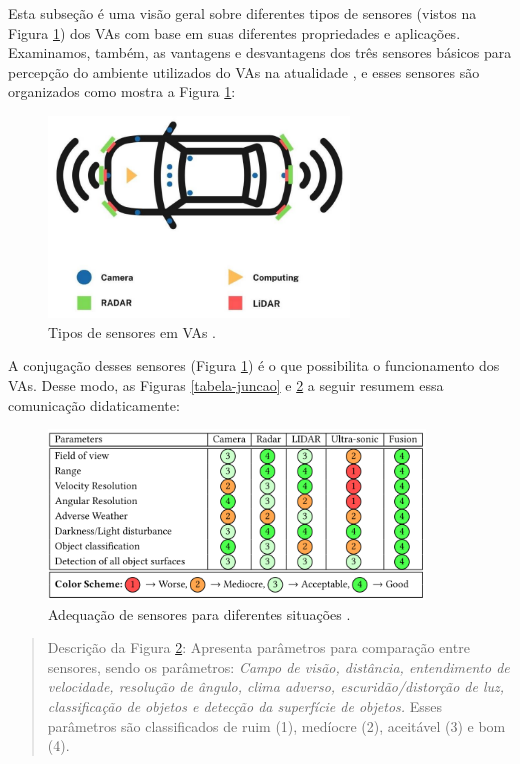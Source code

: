 Esta subseção é uma visão geral sobre diferentes tipos de sensores (vistos na Figura \ref{figura-sensores}) dos VAs com base em suas diferentes propriedades e aplicações. Examinamos, também, as vantagens e desvantagens dos três sensores básicos para percepção do ambiente utilizados do VAs na atualidade \cite{sensors}, e esses sensores são organizados como mostra a Figura \ref{figura-sensores}:
\begin{figure}[H]
\centering
\includegraphics[width=8cm]{Figures/sensores.png}
\caption{Tipos de sensores em VAs \cite{review-auto}.}
\label{figura-sensores}
\end{figure}

A conjugação desses sensores (Figura \ref{figura-sensores}) é o que possibilita o funcionamento dos VAs. Desse modo, as Figuras \ref{tabela-juncao} e \ref{all-sense} a seguir resumem essa comunicação didaticamente:
\begin{figure}[H]
\centering
\includegraphics[width=10cm]{Figures/all-sense.png}
\caption{Adequação de sensores para diferentes situações \cite{sensors-yet}.}
\label{all-sense}
\end{figure}
\begin{quote}
Descrição da Figura \ref{all-sense}: Apresenta parâmetros para comparação entre sensores, sendo os parâmetros: \textit{Campo de visão, distância, entendimento de velocidade, resolução de ângulo, clima adverso, escuridão/distorção de luz, classificação de objetos e detecção da superfície de objetos.} Esses parâmetros são classificados de ruim (1), medíocre (2), 
aceitável (3) e bom (4).
\end{quote}

